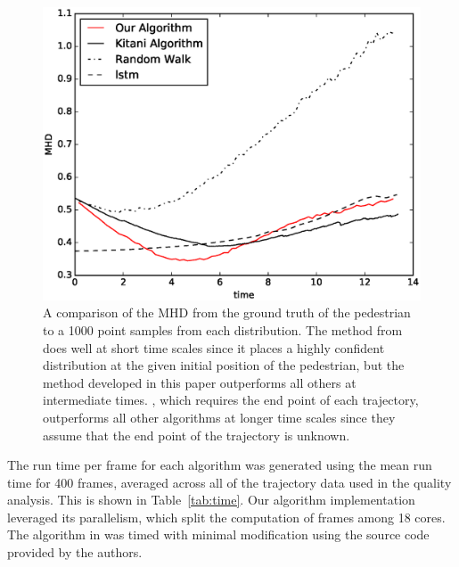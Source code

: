 \documentclass[letterpaper,10pt,conference]{ieeeconf}
\begin{document}
\begin{figure}
	\centering
	\includegraphics[width=0.9\linewidth]{./figures/MHD_results.eps}
	\caption{A comparison of the MHD from the ground truth of the pedestrian to a 1000 point samples from each distribution. The method from \cite{Alahi2016} does well at short time scales since it places a highly confident distribution at the given initial position of the pedestrian, but the method developed in this paper outperforms all others at intermediate times. \cite{Kitani2012}, which requires the end point of each trajectory, outperforms all other algorithms at longer time scales since they assume that the end point of the trajectory is unknown.}
	\label{fig:mhd_vs_time}
	\vspace*{-0.7cm}
\end{figure}


The run time per frame for each algorithm was generated using the mean run time for 400 frames, averaged across all of the trajectory data used in the quality analysis.
This is shown in Table~\ref{tab:time}. 
Our algorithm implementation leveraged its parallelism, which split the computation of frames among 18 cores. 
The algorithm in \cite{Kitani2012} was timed with minimal modification using the source code provided by the authors. 

\end{document}
